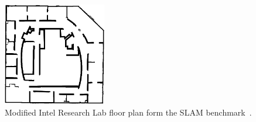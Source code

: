 \documentclass[smallextended]{svjour3}       %
\begin{document}


\begin{figure}
    \centering
    \includegraphics[width=0.4\textwidth]{intel_clean.png}
    \caption{Modified Intel Research Lab floor plan form the SLAM benchmark~\cite{kummerle2009measuring}.}
\label{fig:intel}
\end{figure}
\end{document}
